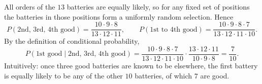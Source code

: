 All orders of the $13$ batteries are equally likely, so for any fixed set of positions the batteries in those positions form a uniformly random selection. Hence
\[P(\text{2nd, 3rd, 4th good})=\dfrac{10\cdot9\cdot8}{13\cdot12\cdot11},\qquad P(\text{1st to 4th good})=\dfrac{10\cdot9\cdot8\cdot7}{13\cdot12\cdot11\cdot10}.\]
By the definition of conditional probability,
\[P(\text{1st good}\mid\text{2nd, 3rd, 4th good})=\dfrac{10\cdot9\cdot8\cdot7}{13\cdot12\cdot11\cdot10}\cdot\dfrac{13\cdot12\cdot11}{10\cdot9\cdot8}=\boxed{\dfrac{7}{10}}.\]
Intuitively: once three good batteries are known to be elsewhere, the first battery is equally likely to be any of the other $10$ batteries, of which $7$ are good.
